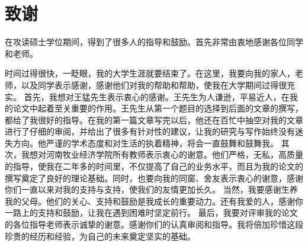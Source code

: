 \chapter{致\hspace{\ccwd}谢}
在攻读硕士学位期间，得到了很多人的指导和鼓励。首先非常由衷地感谢各位同学和老师。

时间过得很快，一眨眼，我的大学生涯就要结束了。在这里，我要向我的家人，老师，以及同学表示感谢，感谢他们对我的帮助和帮助，使我在大学期间过得很充实。
首先，我想对王猛先生表示衷心的感谢。王先生为人谦逊，平易近人，在我的论文中起着至关重要的作用。王先生从第一个题目的选择到后面的文章的撰写，都给了我很好的指导。在我的第一篇文章写完以后，他还在百忙中抽空对我的文章进行了仔细的审阅，并给出了很多有针对性的建议，让我的研究与写作始终没有迷失方向。他严谨的学术态度和对生活的执着精神，将会一直鼓舞和鼓舞我。
其次，我想对河南牧业经济学院所有教师表示衷心的谢意。他们严格，无私，高质量的指导，使我在二年多的时间里，不仅提高了自己的业务水平，而且为我的论文的撰写奠定了良好的理论基础。同时，也要向我的同窗、舍友表示衷心的谢意，感谢你们一直以来对我的支持与支持，使我们的友情更加长久。
当然，我要感谢生养我的父母。他们的关心、支持和鼓励是我成长的重要动力。还有我爱的人，感谢你一路上的支持和鼓励，让我在遇到困难时坚定前行。
最后，我要对评审我的论文的各位指导老师表示诚挚的谢意。感谢你们的认真审阅和指导。我将倍加珍惜这段珍贵的经历和经验，为自己的未来奠定坚实的基础。
